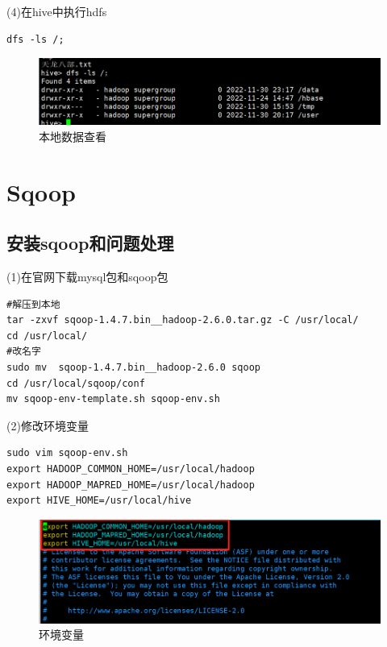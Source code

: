 \documentclass[12pt]{article}
\begin{document}
(4)在hive中执行hdfs
\begin{lstlisting}[language={[ANSI]C}]
dfs -ls /;
\end{lstlisting}

\begin{figure}[ht]
\centering
\includegraphics[scale=1.0]{figures/20.png}
\caption{本地数据查看}\label{fig:label2}
\end{figure}

\section{Sqoop}

\subsection{安装sqoop和问题处理}

(1)在官网下载mysql包和sqoop包
\begin{lstlisting}[language={[ANSI]C}]
#解压到本地
tar -zxvf sqoop-1.4.7.bin__hadoop-2.6.0.tar.gz -C /usr/local/
cd /usr/local/
#改名字
sudo mv  sqoop-1.4.7.bin__hadoop-2.6.0 sqoop
cd /usr/local/sqoop/conf
mv sqoop-env-template.sh sqoop-env.sh
\end{lstlisting}

(2)修改环境变量
\begin{lstlisting}[language={[ANSI]C}]
sudo vim sqoop-env.sh
export HADOOP_COMMON_HOME=/usr/local/hadoop
export HADOOP_MAPRED_HOME=/usr/local/hadoop
export HIVE_HOME=/usr/local/hive
\end{lstlisting}

\begin{figure}[ht]
\centering
\includegraphics[scale=1.0]{figures/22.png}
\caption{环境变量}\label{fig:label2}
\end{figure}
\end{document}
